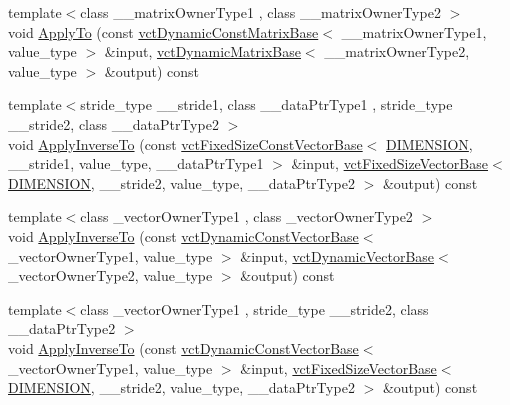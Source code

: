 \begin{DoxyCompactItemize}
{\footnotesize template$<$class \-\_\-\-\_\-matrix\-Owner\-Type1 , class \-\_\-\-\_\-matrix\-Owner\-Type2 $>$ }\\void \hyperlink{classvct_frame_base_a0505401809f053321347cd40d03a531c}{Apply\-To} (const \hyperlink{classvct_dynamic_const_matrix_base}{vct\-Dynamic\-Const\-Matrix\-Base}$<$ \-\_\-\-\_\-matrix\-Owner\-Type1, value\-\_\-type $>$ \&input, \hyperlink{classvct_dynamic_matrix_base}{vct\-Dynamic\-Matrix\-Base}$<$ \-\_\-\-\_\-matrix\-Owner\-Type2, value\-\_\-type $>$ \&output) const 
\item 
{\footnotesize template$<$stride\-\_\-type \-\_\-\-\_\-stride1, class \-\_\-\-\_\-data\-Ptr\-Type1 , stride\-\_\-type \-\_\-\-\_\-stride2, class \-\_\-\-\_\-data\-Ptr\-Type2 $>$ }\\void \hyperlink{classvct_frame_base_abbd4cea11e09dc6fa6a53e25abdcb35d}{Apply\-Inverse\-To} (const \hyperlink{classvct_fixed_size_const_vector_base}{vct\-Fixed\-Size\-Const\-Vector\-Base}$<$ \hyperlink{classvct_frame_base_a4284a4e875533c13df90a20c0233e043ad25b85efd5e4c2687ddf38ae18cd88f0}{D\-I\-M\-E\-N\-S\-I\-O\-N}, \-\_\-\-\_\-stride1, value\-\_\-type, \-\_\-\-\_\-data\-Ptr\-Type1 $>$ \&input, \hyperlink{classvct_fixed_size_vector_base}{vct\-Fixed\-Size\-Vector\-Base}$<$ \hyperlink{classvct_frame_base_a4284a4e875533c13df90a20c0233e043ad25b85efd5e4c2687ddf38ae18cd88f0}{D\-I\-M\-E\-N\-S\-I\-O\-N}, \-\_\-\-\_\-stride2, value\-\_\-type, \-\_\-\-\_\-data\-Ptr\-Type2 $>$ \&output) const 
\item 
{\footnotesize template$<$class \-\_\-vector\-Owner\-Type1 , class \-\_\-vector\-Owner\-Type2 $>$ }\\void \hyperlink{classvct_frame_base_aeef080a54a5ff97a0d923243de00a667}{Apply\-Inverse\-To} (const \hyperlink{classvct_dynamic_const_vector_base}{vct\-Dynamic\-Const\-Vector\-Base}$<$ \-\_\-vector\-Owner\-Type1, value\-\_\-type $>$ \&input, \hyperlink{classvct_dynamic_vector_base}{vct\-Dynamic\-Vector\-Base}$<$ \-\_\-vector\-Owner\-Type2, value\-\_\-type $>$ \&output) const 
\item 
{\footnotesize template$<$class \-\_\-vector\-Owner\-Type1 , stride\-\_\-type \-\_\-\-\_\-stride2, class \-\_\-\-\_\-data\-Ptr\-Type2 $>$ }\\void \hyperlink{classvct_frame_base_a1007112f94139cc870f4ccec636473c6}{Apply\-Inverse\-To} (const \hyperlink{classvct_dynamic_const_vector_base}{vct\-Dynamic\-Const\-Vector\-Base}$<$ \-\_\-vector\-Owner\-Type1, value\-\_\-type $>$ \&input, \hyperlink{classvct_fixed_size_vector_base}{vct\-Fixed\-Size\-Vector\-Base}$<$ \hyperlink{classvct_frame_base_a4284a4e875533c13df90a20c0233e043ad25b85efd5e4c2687ddf38ae18cd88f0}{D\-I\-M\-E\-N\-S\-I\-O\-N}, \-\_\-\-\_\-stride2, value\-\_\-type, \-\_\-\-\_\-data\-Ptr\-Type2 $>$ \&output) const 

\end{DoxyCompactItemize}
